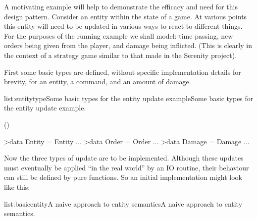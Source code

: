 A motivating example will help to demonstrate the efficacy and need for this design pattern. Consider an entity within the state of a game. At various points this entity will need to be updated in various ways to react to different things. For the purposes of the running example we shall model: time passing, new orders being given from the player, and damage being inflicted. (This is clearly in the context of a strategy game similar to that made in the Serenity project).

First some basic types are defined, without specific implementation details for brevity, for an entity, a command, and an amount of damage.

\vspace{-0.5em}
\begin{listing}{list:entitytype}{Some basic types for the entity update example}{Some basic types for the entity update example.}{}
\end{listing}\vspace{-1.5em}

\functions()
\begin{haskell}

>data Entity = Entity {...}
>data Order = Order {...}
>data Damage = Damage {...}

\end{haskell}
\noindent Now the three types of update are to be implemented. Although these updates must eventually be applied ``in the real world'' by an IO routine, their behaviour can still be defined by pure functions. So an initial implementation might look like this:

\vspace{-0.5em}
\begin{listing}{list:basicentity}{A naive approach to entity semantics}{A naive approach to entity semantics.}{}
\end{listing}\vspace{-1.5em}

